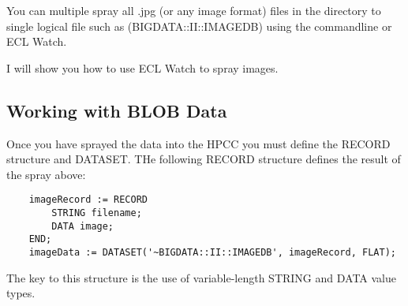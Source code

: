 \documentclass[11pt,a4paper]{report}
\begin{document}
	You can multiple spray all .jpg (or any image format) files in the directory to single logical file such as (BIGDATA::II::IMAGEDB) using the commandline or ECL Watch.
	
	I will show you how to use ECL Watch to spray images.
	
	\subsection{Working with BLOB Data}
	
	Once you have sprayed the data into the HPCC you must define the RECORD structure and DATASET. THe following RECORD structure defines the result of the spray above:
	
	\begin{verbatim} 
	imageRecord := RECORD
		STRING filename;
		DATA image;
	END;
	imageData := DATASET('~BIGDATA::II::IMAGEDB', imageRecord, FLAT);
	\end{verbatim}
	
	The key to this structure is the use of variable-length STRING and DATA value types.
	
	
	
\end{document}
